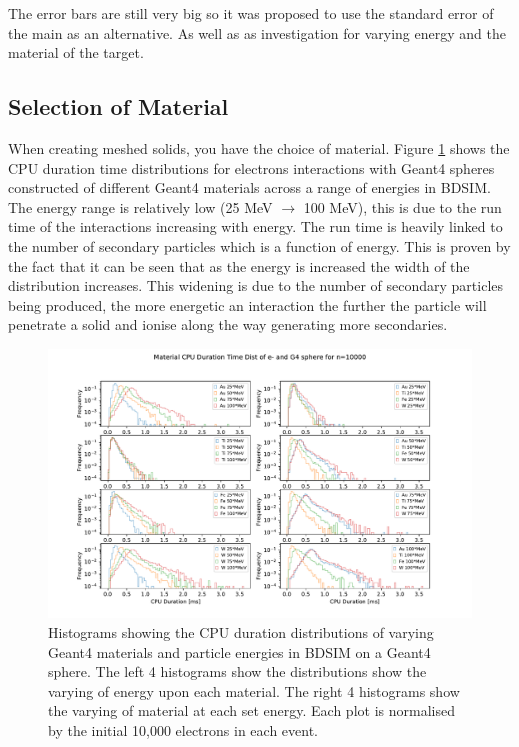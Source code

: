 \documentclass[12pt,a4paper]{article}
\begin{document}
The error bars are still very big so it was proposed to use the standard error of the main as an alternative. As well as as investigation for varying energy and the material of the target.

\subsection{Selection of Material}
When creating meshed solids, you have the choice of material. Figure \ref{novar} shows the CPU duration time distributions for electrons interactions with Geant4 spheres constructed of different Geant4 materials across a range of energies in BDSIM. The energy range is relatively low (25 MeV $\rightarrow$ 100 MeV), this is due to the run time of the interactions increasing with energy. The run time is heavily linked to the number of secondary particles which is a function of energy. This is proven by the fact that it can be seen that as the energy is increased the width of the distribution increases. This widening is due to the number of secondary particles being produced, the more energetic an interaction the further the particle will penetrate a solid and ionise along the way generating more secondaries.

\begin{figure}[h!]
\centering
\includegraphics[scale=0.6]{Images//Materials//not_Varied_by_radius_and_secondaries.pdf}
\caption[width=\columnwidth]{Histograms showing the CPU duration distributions of varying Geant4 materials and particle energies in BDSIM on a Geant4 sphere. The left 4 histograms show the distributions show the varying of energy upon each material. The right 4 histograms show the varying of material at each set energy. Each plot is normalised by the initial 10,000 electrons in each event.}
\label{novar}
\end{figure}
\end{document}
